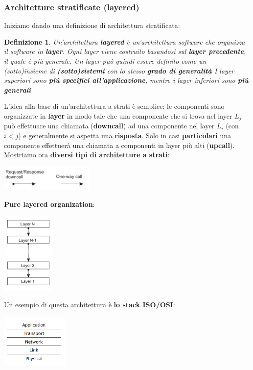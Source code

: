 \documentclass[12pt]{article}
\newtheorem{Definizione}{Definizione}[subsection]
\begin{document}
\subsubsection{Architetture stratificate (layered)}
Iniziamo dando una definizione di architettura stratificata:
\begin{Definizione}
    Un'architettura \textbf{layered} è un'architettura software che organizza il software in \textbf{layer}. Ogni layer viene costruito basandosi sul \textbf{layer precedente}, il quale è più generale. \newline
    Un layer può quindi essere definito come un (sotto)insieme di \textbf{(sotto)sistemi} con lo stesso \textbf{grado di generalità} \newline
    I layer superiori sono \textbf{più specifici all'applicazione}, mentre i layer inferiori sono \textbf{più generali}
\end{Definizione}
L'idea alla base di un'architettura a strati è semplice: le componenti sono organizzate in \textbf{layer} in modo tale che una componente che si trova nel layer $L_j$ può effettuare una chiamata (\textbf{downcall}) ad una componente nel layer $L_i$ (con $i < j$) e generalmente si aspetta una \textbf{risposta}. Solo in casi \textbf{particolari} una componente effettuerà una chiamata a componenti in layer più alti (\textbf{upcall}). Mostriamo ora \textbf{diversi tipi di architetture a strati}:
\begin{center}
    \includegraphics[width = 0.35\textwidth]{Images/3.PNG}
\end{center}
\textbf{Pure layered organization}:
\begin{center}
    \includegraphics[width = 0.20\textwidth]{Images/4.PNG}
\end{center}
Un esempio di questa architettura è \textbf{lo stack ISO/OSI}:
\begin{center}
    \includegraphics[width = 0.25\textwidth]{Images/5.PNG}
\end{center}
\end{document}
